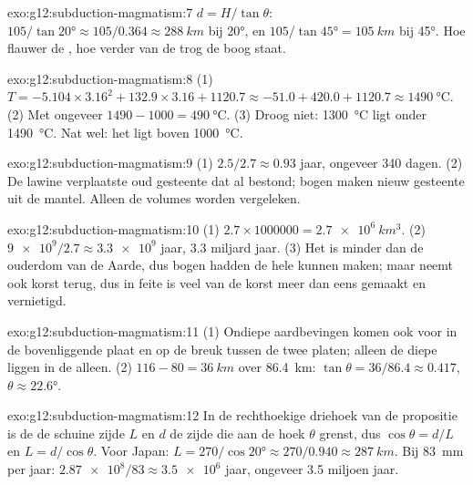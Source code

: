 \begin{solution}{exo:g12:subduction-magmatism:7}
$d = H/\tan\theta$: $105/\tan\ang{20} \approx 105/0.364 \approx
\qty{288}{km}$ bij \ang{20}, en $105/\tan\ang{45} = \qty{105}{km}$ bij
\ang{45}. Hoe flauwer de , hoe verder van de trog de boog staat.
\end{solution}

\begin{solution}{exo:g12:subduction-magmatism:8}
(1) $T = -5.104 \times 3.16^2 + 132.9 \times 3.16 + 1120.7 \approx -51.0 +
420.0 + 1120.7 \approx \qty{1490}{\celsius}$. (2) Met ongeveer $1490 - 1000 =
\qty{490}{\celsius}$. (3) Droog niet: \qty{1300}{\celsius} ligt onder
\qty{1490}{\celsius}. Nat wel: het ligt boven \qty{1000}{\celsius}.
\end{solution}

\begin{solution}{exo:g12:subduction-magmatism:9}
(1) $2.5/2.7 \approx 0.93$ jaar, ongeveer 340 dagen. (2) De lawine verplaatste
oud gesteente dat al bestond; bogen maken nieuw gesteente uit de mantel. Alleen de
volumes worden vergeleken.
\end{solution}

\begin{solution}{exo:g12:subduction-magmatism:10}
(1) $2.7 \times \num{1000000} = \qty{2.7e6}{km^3}$. (2) $\num{9e9}/2.7
\approx \num{3.3e9}$ jaar, 3.3 miljard jaar. (3) Het is minder dan de ouderdom van
de Aarde, dus bogen hadden de hele  kunnen maken; maar
 neemt ook korst terug, dus in feite is veel van de korst
meer dan eens gemaakt en vernietigd.
\end{solution}

\begin{solution}{exo:g12:subduction-magmatism:11}
(1) Ondiepe aardbevingen komen ook voor in de bovenliggende plaat en op de breuk
tussen de twee platen; alleen de diepe liggen in de  alleen.
(2) $116 - 80 = \qty{36}{km}$ over \qty{86.4}{km}: $\tan\theta = 36/86.4
\approx 0.417$, $\theta \approx \ang{22.6}$.
\end{solution}

\begin{solution}{exo:g12:subduction-magmatism:12}
In de rechthoekige driehoek van de propositie is de  de schuine zijde $L$
en $d$ de zijde die aan de hoek $\theta$ grenst, dus $\cos\theta = d/L$ en $L =
d/\cos\theta$. Voor Japan: $L = 270/\cos\ang{20} \approx 270/0.940 \approx
\qty{287}{km}$. Bij \qty{83}{mm} per jaar: $\num{2.87e8}/83 \approx \num{3.5e6}$
jaar, ongeveer 3.5 miljoen jaar.
\end{solution}


